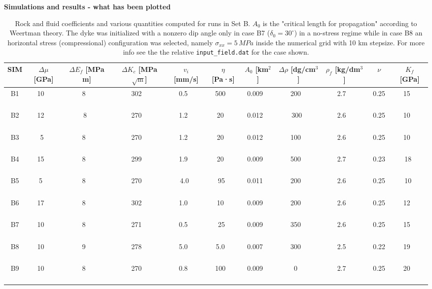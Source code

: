 \documentclass[9pt]{beamer}
\begin{document}
\begin{frame}[allowframebreaks]{\textbf{Simulations and results - what has been plotted}}
\begin{table}[h]
\end{table}
\begin{table}[!ht]
    \centering
\begin{tabular}{|c|c|c|c|c|c|c|c|c|c|c|}
    \hline
    \textbf{SIM} & \textbf{$\Delta\mu$}[GPa] & \textbf{$\Delta E_f$} [MPa m] & \textbf{$\Delta K_c$ }[MPa$\sqrt{\text{m}}$] & \textbf{$v_i$} [mm/s] & \textbf{$\eta$ }[Pa·s] & \textbf{$A_0$} [km$^2$]  & \textbf{$\Delta \rho$ }[dg/cm$^3$] & \textbf{$\rho_f$ }[kg/dm$^3$] & \textbf{$\nu$} & \textbf{$K_f$} [GPa] \\
    \hline
    B1 &10 ~ &8 ~ &302 ~ &0.5 ~ &500 ~ &0.009 ~ &200 ~ &2.7 ~ &0.25 ~ &15 ~ \\ \hline
    B2 &12 ~ & 8~ &270 ~ &1.2 ~ &20 ~ &0.012  ~ & 300~ &2.6 ~ &0.25 ~ &10 ~ \\ \hline
    B3 & 5~ &8 ~ &270 ~ &1.2 ~ &20 ~ & 0.012 ~ &100 ~ &2.6 ~ &0.25 ~ &10 ~ \\ \hline
    B4 &15 ~ &8 ~ &299 ~ &1.9 ~ &20 ~ &0.009  ~ &500 ~ &2.7 ~ &0.23 ~ &18~ \\ \hline
    B5 &5 ~ &8 ~ &270 ~ & 4.0~ & 95~ &0.011  ~ &200 ~ &2.6 ~ &0.25 ~ &10~ \\ \hline
    B6 &17 ~ &8 ~ &302 ~ &1.0 ~ &10 ~ &0.009  ~ &200 ~ &2.6 ~ &0.25 ~ &12 ~ \\ \hline
    B7 &10 ~ &8 ~ &271 ~ &0.5 ~ & 25~ &0.009  ~ &350 ~ &2.6 ~ &0.25 ~ &15 ~ \\ \hline
    B8 &10 ~ &9 ~ &278 ~ &5.0 ~ &5.0 ~ &0.007 ~ &300 ~ &2.5 ~ &0.22 ~ &19 ~ \\ \hline
    B9 &10 ~ &8 ~ &270 ~ &0.8 ~ &100 ~ &0.009 ~ &0 ~ &2.7 ~ &0.25 ~ &20 ~ \\ \hline
\end{tabular}
    \caption{Rock and fluid coefficients and various quantities computed for runs in Set B. $A_0$ is the "critical length for propagation" according to Weertman theory. The dyke was initialized with a nonzero dip angle only in case B7 ($\delta_0=30^\circ$) in a no-stress regime while in case B8 an horizontal stress (compressional) configuration was selected, namely $\sigma_{xx}=5 \, MPa$ inside the numerical grid with 10 km stepsize. For more info see the the relative \texttt{input\_field.dat} for the case shown.}
\end{table}

\end{frame}
\end{document}
